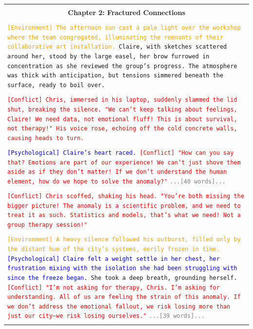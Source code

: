 \documentclass[letterpaper]{article} %
\begin{document}
\begin{small}
\begin{longtable}{p{\textwidth}}
    \midrule \\
    \multicolumn{1}{c}{\normalsize \textbf{Chapter 2: Fractured Connections}} \\\\
    
    \texttt{\textcolor{orange}{[Environment] The afternoon sun cast a pale light over the workshop where the team congregated, illuminating the remnants of their collaborative art installation.} Claire, with sketches scattered around her, stood by the large easel, her brow furrowed in concentration as she reviewed the group's progress. The atmosphere was thick with anticipation, but tensions simmered beneath the surface, ready to boil over.} \\\\

    \texttt{\textcolor{red}{[Conflict] Chris, immersed in his laptop, suddenly slammed the lid shut, breaking the silence. "We can't keep talking about feelings, Claire! We need data, not emotional fluff! This is about survival, not therapy!" His voice rose, echoing off the cold concrete walls, causing heads to turn.}} \\\\

    \texttt{\textcolor{blue}{[Psychological] Claire's heart raced.} \textcolor{red}{[Conflict] "How can you say that? Emotions are part of our experience! We can't just shove them aside as if they don't matter! If we don't understand the human element, how do we hope to solve the anomaly?"}}
    \texttt{\textcolor{gray}{...[40 words]...}} \\\\

    \texttt{\textcolor{red}{[Conflict] Chris scoffed, shaking his head. "You're both missing the bigger picture! The anomaly is a scientific problem, and we need to treat it as such. Statistics and models, that's what we need! Not a group therapy session!"}} \\\\

    \texttt{\textcolor{orange}{[Environment] A heavy silence followed his outburst, filled only by the distant hum of the city's systems, eerily frozen in time.} \textcolor{blue}{[Psychological] Claire felt a weight settle in her chest, her frustration mixing with the isolation she had been struggling with since the freeze began.} She took a deep breath, grounding herself. \textcolor{red}{[Conflict] "I'm not asking for therapy, Chris. I'm asking for understanding. All of us are feeling the strain of this anomaly. If we don't address the emotional fallout, we risk losing more than just our city—we risk losing ourselves."}}
    \texttt{\textcolor{gray}{...[39 words]...}} \\\\


\end{longtable}
\end{small}
\end{document}
